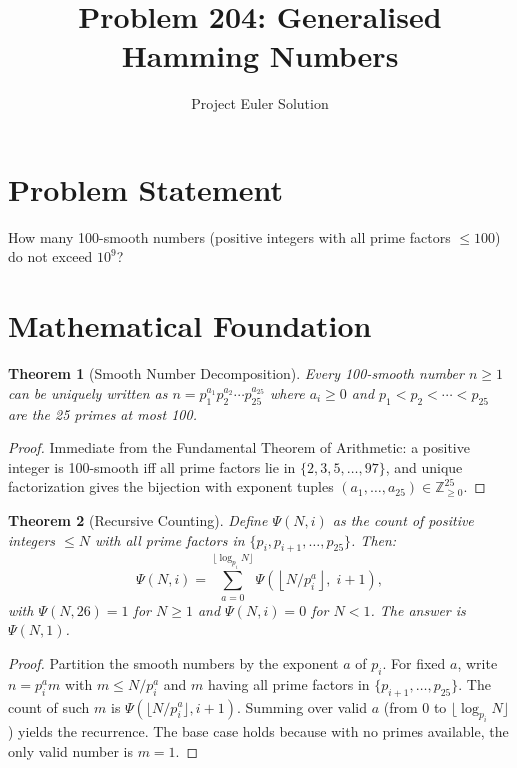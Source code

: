 \documentclass[12pt]{article}
\title{Problem 204: Generalised Hamming Numbers}
\author{Project Euler Solution}
\date{}
\newtheorem{theorem}{Theorem}
\begin{document}
\maketitle

\section{Problem Statement}
How many 100-smooth numbers (positive integers with all prime factors $\leq 100$) do not
exceed $10^9$?

\section{Mathematical Foundation}

\begin{theorem}[Smooth Number Decomposition]
Every 100-smooth number $n \geq 1$ can be uniquely written as
$n = p_1^{a_1} p_2^{a_2} \cdots p_{25}^{a_{25}}$ where $a_i \geq 0$ and
$p_1 < p_2 < \cdots < p_{25}$ are the 25 primes at most 100.
\end{theorem}

\begin{proof}
Immediate from the Fundamental Theorem of Arithmetic: a positive integer is 100-smooth
iff all prime factors lie in $\{2, 3, 5, \ldots, 97\}$, and unique factorization gives
the bijection with exponent tuples $(a_1, \ldots, a_{25}) \in \mathbb{Z}_{\geq 0}^{25}$.
\end{proof}

\begin{theorem}[Recursive Counting]
Define $\Psi(N, i)$ as the count of positive integers $\leq N$ with all prime factors in
$\{p_i, p_{i+1}, \ldots, p_{25}\}$. Then:
\[
\Psi(N, i) = \sum_{a=0}^{\lfloor \log_{p_i} N \rfloor}
\Psi\!\left(\left\lfloor N/p_i^a \right\rfloor,\; i+1\right),
\]
with $\Psi(N, 26) = 1$ for $N \geq 1$ and $\Psi(N, i) = 0$ for $N < 1$. The answer is
$\Psi(N, 1)$.
\end{theorem}

\begin{proof}
Partition the smooth numbers by the exponent $a$ of $p_i$. For fixed $a$, write $n = p_i^a m$
with $m \leq N/p_i^a$ and $m$ having all prime factors in $\{p_{i+1}, \ldots, p_{25}\}$.
The count of such $m$ is $\Psi(\lfloor N/p_i^a\rfloor, i+1)$. Summing over valid $a$
(from 0 to $\lfloor\log_{p_i} N\rfloor$) yields the recurrence. The base case holds because
with no primes available, the only valid number is $m = 1$.
\end{proof}
\end{document}
